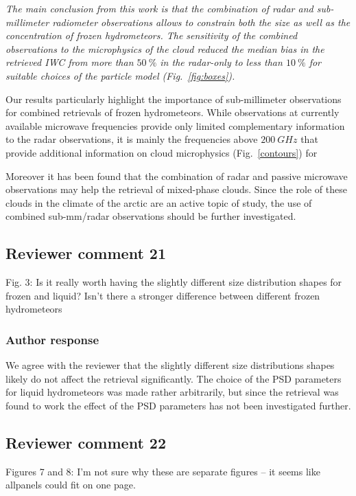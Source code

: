 \documentclass[11pt]{scrartcl}
\begin{document}
{\itshape The main conclusion from this work is that the combination of radar and
  sub-millimeter radiometer observations allows to constrain both the size
  as well as the concentration of frozen hydrometeors. The sensitivity of
  the combined observations to the microphysics of the cloud reduced the
  median bias in the retrieved IWC from more than $50\ \%$ in the radar-only
  to less than $10\ \%$ for suitable choices of the particle model (Fig.~\ref{fig:boxes}).

  Our results particularly highlight the importance of sub-millimeter observations
  for combined retrievals of frozen hydrometeors. While observations at currently
  available microwave frequencies provide only limited complementary information
  to the radar observations, it is mainly the frequencies above $200\ \unit{GHz}$
  that provide additional information on cloud microphysics (Fig.~\ref{contours})
  for

  Moreover it has been found that the combination of radar and passive microwave
  observations may help the retrieval of mixed-phase clouds. Since the role of
  these clouds in the climate of the arctic are an active topic of study, the use
  of combined sub-mm/radar observations should be further investigated.}


\subsection*{Reviewer comment 21}
Fig.  3: Is it really worth having the slightly different size distribution shapes for frozen and liquid? Isn’t there a stronger difference between different frozen hydrometeors

\subsubsection*{Author response}

We agree with the reviewer that the slightly different size distributions shapes likely do
not affect the retrieval significantly. The choice of the PSD parameters for liquid
hydrometeors was made rather arbitrarily, but since the retrieval was found to work
the effect of the PSD parameters has not been investigated further.

\subsection*{Reviewer comment 22}
Figures 7 and 8:  I’m not sure why these are separate figures – it seems like allpanels could fit on one page.
\end{document}
